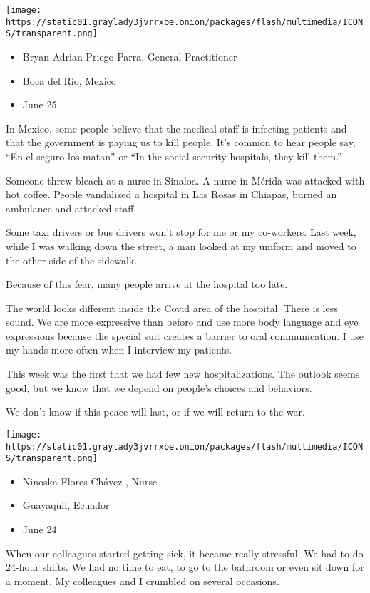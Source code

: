 \texttt{[image: https://static01.graylady3jvrrxbe.onion/packages/flash/multimedia/ICONS/transparent.png]}

\begin{itemize}
\tightlist
\item
  Bryan Adrian Priego Parra, General Practitioner
\item
  Boca del Río, Mexico
\item
  June 25
\end{itemize}

In Mexico, some people believe that the medical staff is infecting
patients and that the government is paying us to kill people. It's
common to hear people say, ``En el seguro los matan'' or ``In the social
security hospitals, they kill them.''

Someone threw bleach at a nurse in Sinaloa. A nurse in Mérida was
attacked with hot coffee. People vandalized a hospital in Las Rosas in
Chiapas, burned an ambulance and attacked staff.

Some taxi drivers or bus drivers won't stop for me or my co-workers.
Last week, while I was walking down the street, a man looked at my
uniform and moved to the other side of the sidewalk.

Because of this fear, many people arrive at the hospital too late.

The world looks different inside the Covid area of the hospital. There
is less sound. We are more expressive than before and use more body
language and eye expressions because the special suit creates a barrier
to oral communication. I use my hands more often when I interview my
patients.

This week was the first that we had few new hospitalizations. The
outlook seems good, but we know that we depend on people's choices and
behaviors.

We don't know if this peace will last, or if we will return to the war.

\texttt{[image: https://static01.graylady3jvrrxbe.onion/packages/flash/multimedia/ICONS/transparent.png]}

\begin{itemize}
\tightlist
\item
  Ninoska Flores Chávez , Nurse
\item
  Guayaquil, Ecuador
\item
  June 24
\end{itemize}

When our colleagues started getting sick, it became really stressful. We
had to do 24-hour shifts. We had no time to eat, to go to the bathroom
or even sit down for a moment. My colleagues and I crumbled on several
occasions.

